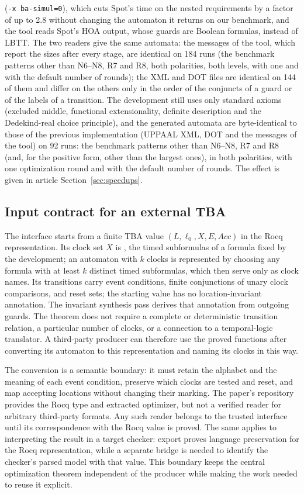 (\texttt{-x ba-simul=0}), which cuts Spot's time on the nested requirements by a factor of up to 2.8
without changing the automaton it returns on our benchmark, and the tool reads
Spot's HOA output, whose guards are Boolean formulas, instead of LBTT. The
two readers give the same automata: the messages of the tool, which report the
sizes after every stage, are identical on 184 runs (the benchmark patterns other
than N6--N8, R7 and R8, both polarities, both levels, with one and with the
default number of rounds); the XML and DOT files are identical on 144 of them
and differ on the others only in the order of the conjuncts of a guard or of the
labels of a transition.
The development still uses only standard axioms (excluded middle, functional
extensionality, definite description and the Dedekind-real choice
principle), and the generated automata are byte-identical to those of the
previous implementation (UPPAAL XML, DOT and the messages of the tool) on 92
runs: the benchmark patterns other than N6--N8, R7 and R8 (and, for the positive
form, other than the largest ones), in both polarities, with one optimization
round and with the default number of rounds. The effect is given in article Section~\ref{sec:speedups}.

\subsection{Input contract for an external TBA}
\label{sec:generic-input-detail}
The interface starts from a finite TBA value
$(L,\ell_0,X,E,\mathit{Acc})$ in the Rocq representation. Its clock set
$X$ is , the timed subformulas of a formula 
fixed by the development; an automaton with $k$ clocks is represented by
choosing any formula with at least $k$ distinct timed subformulas, which then
serve only as clock names. Its transitions carry
event conditions, finite conjunctions of unary clock comparisons, and reset
sets; the starting value has no location-invariant annotation. The invariant
synthesis pass derives that annotation from outgoing guards. The theorem
does not require a complete or deterministic transition relation, a particular
number of clocks, or a connection to a temporal-logic translator. A third-party
producer can therefore use the proved functions after converting its automaton
to this representation and naming its clocks in this way.

The conversion is a semantic boundary: it must retain the alphabet and the
meaning of each event condition, preserve which clocks are tested and reset,
and map accepting locations without changing their marking. The paper's
repository provides the Rocq type and extracted optimizer, but not a verified
reader for arbitrary third-party formats. Any such reader belongs to the
trusted interface until its correspondence with the Rocq value is proved. The
same applies to interpreting the result in a target checker: export proves
language preservation for the Rocq representation, while a separate bridge is
needed to identify the checker's parsed model with that value. This boundary
keeps the central optimization theorem independent of the producer while making the
work needed to reuse it explicit.


